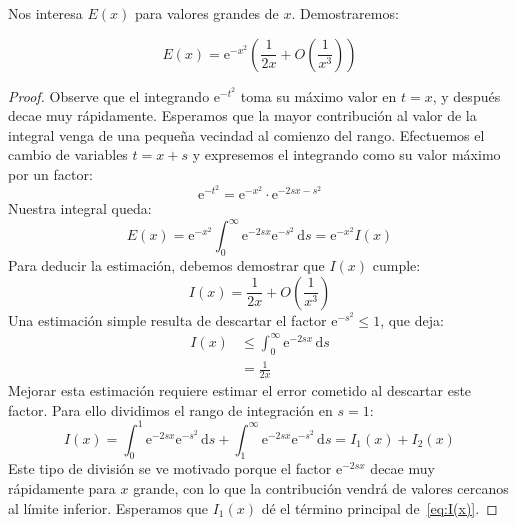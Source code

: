   Nos interesa \(E(x)\) para valores grandes de \(x\).
  Demostraremos:
  \begin{theorem}
    \label{theo:error-integral}
    \begin{equation}
      \label{eq:error-integral}
      E(x)
        = \mathrm{e}^{-x^2}
            \left(
              \frac{1}{2 x} + O\left( \frac{1}{x^3} \right)
            \right)
    \end{equation}
  \end{theorem}
  \begin{proof}
    Observe que el integrando \(\mathrm{e}^{-t^2}\)
    toma su máximo valor en \(t = x\),
    y después decae muy rápidamente.
    Esperamos que la mayor contribución al valor de la integral
    venga de una pequeña vecindad al comienzo del rango.
    Efectuemos el cambio de variables \(t = x + s\)
    y expresemos el integrando como su valor máximo por un factor:
    \begin{equation*}
      \mathrm{e}^{-t^2}
        = \mathrm{e}^{-x^2}
            \cdot \mathrm{e}^{- 2 s x - s^2}
    \end{equation*}
    Nuestra integral queda:
    \begin{equation*}
      E(x)
        = \mathrm{e}^{-x^2}
            \int_0^\infty
              \mathrm{e}^{- 2 s x} \mathrm{e}^{- s^2} \, \mathrm{d} s
        = \mathrm{e}^{-x^2} I(x)
    \end{equation*}
   Para deducir la estimación,
   debemos demostrar que \(I(x)\) cumple:
   \begin{equation}
     \label{eq:I(x)}
     I(x)
       = \frac{1}{2 x} + O\left( \frac{1}{x^3} \right)
   \end{equation}
   Una estimación simple resulta
   de descartar el factor \(\mathrm{e}^{-s^2} \le 1\),
   que deja:
   \begin{align*}
     I(x)
       &\le \int_0^\infty \mathrm{e}^{- 2 s x} \, \mathrm{d} s \\
       &= \frac{1}{2 x}
   \end{align*}
   Mejorar esta estimación requiere estimar el error cometido
   al descartar este factor.
   Para ello dividimos el rango de integración en \(s = 1\):
   \begin{equation*}
     I(x)
       = \int_0^1 \mathrm{e}^{- 2 s x} \mathrm{e}^{-s^2} \, \mathrm{d} s
           + \int_1^\infty
               \mathrm{e}^{- 2 s x} \mathrm{e}^{-s^2} \, \mathrm{d} s
       = I_1(x) + I_2(x)
   \end{equation*}
   Este tipo de división se ve motivado
   porque el factor \(\mathrm{e}^{-2 s x}\)
   decae muy rápidamente para \(x\) grande,
   con lo que la contribución vendrá de valores cercanos al límite inferior.
   Esperamos que \(I_1(x)\) dé el término principal de~\eqref{eq:I(x)}.


\end{proof}
